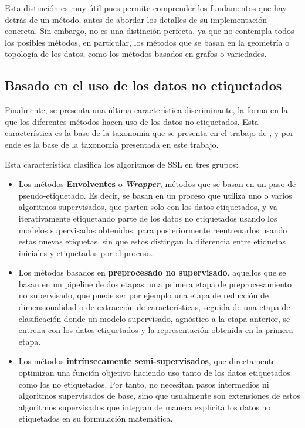 Esta distinción es muy útil pues permite comprender los fundamentos que hay detrás de un método, antes de abordar los detalles de su implementación concreta. Sin embargo, no es una distinción perfecta, ya que no contempla todos los posibles métodos, en particular, los métodos que se basan en la geometría o topología de los datos, como los métodos basados en grafos o variedades.

\subsection{Basado en el uso de los datos no etiquetados}
\label{sec:div-uso-etiquetas}

Finalmente, se presenta una última característica discriminante, la forma en la que los diferentes métodos hacen uso de los datos no etiquetados. Esta característica es la base de la taxonomía que se presenta en el trabajo de \citet{van2020survey}, y por ende es la base de la taxonomía presentada en este trabajo.

Esta característica clasifica los algoritmos de \gls{SSL} en tres grupos: 
\begin{itemize}
    \item Los métodos \textbf{Envolventes} o \textbf{\textit{Wrapper}}, métodos que se basan en un paso de pseudo-etiquetado. Es decir, se basan en un proceso que utiliza uno o varios algoritmos supervisados, que parten solo con los datos etiquetados, y va iterativamente etiquetando parte de los datos no etiquetados usando los modelos supervisados obtenidos, para posteriormente reentrenarlos usando estas nuevas etiquetas, sin que estos distingan la diferencia entre etiquetas iniciales y etiquetadas por el proceso. 
    \item Los métodos basados en \textbf{preprocesado no supervisado}, aquellos que se basan en un pipeline de dos etapas: una primera etapa de preprocesamiento no supervisado, que puede ser por ejemplo una etapa de reducción de dimensionalidad o de extracción de características, seguida de una etapa de clasificación donde un modelo supervisado, agnóstico a la etapa anterior, se entrena con los datos etiquetados y  la representación obtenida en la primera etapa.
    \item Los métodos \textbf{intrínsecamente semi-supervisados}, que directamente optimizan una función objetivo haciendo uso tanto de los datos etiquetados como los no etiquetados. Por tanto, no necesitan pasos intermedios ni algoritmos supervisados de base, sino que usualmente son extensiones de estos algoritmos supervisados que integran de manera explícita los datos no etiquetados en su formulación matemática.
\end{itemize}

